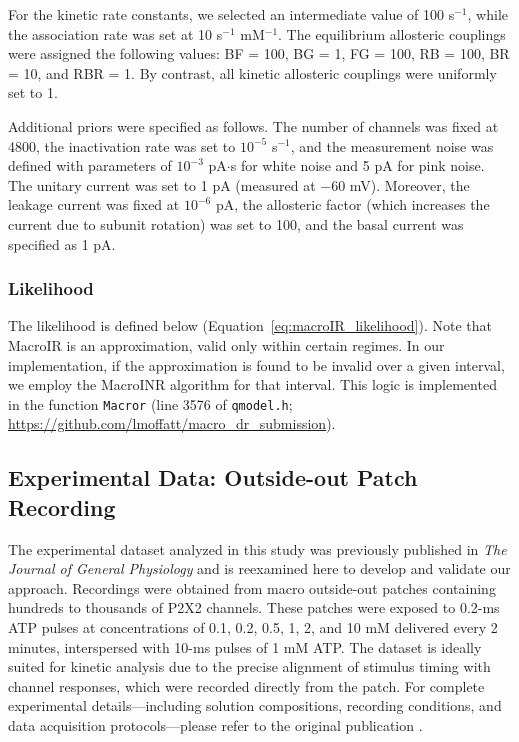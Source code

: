 \documentclass[pdflatex,sn-nature]{sn-jnl}%
\begin{document}
For the kinetic rate constants, we selected an intermediate value of 100 s$^{-1}$, while the association rate was set at 10 s$^{-1}$ mM$^{-1}$. The equilibrium allosteric couplings were assigned the following values: BF = 100, BG = 1, FG = 100, RB = 100, BR = 10, and RBR = 1. By contrast, all kinetic allosteric couplings were uniformly set to 1.

Additional priors were specified as follows. The number of channels was fixed at 4800, the inactivation rate was set to $10^{-5}$ s$^{-1}$, and the measurement noise was defined with parameters of $10^{-3}$ pA$\cdot$s for white noise and 5 pA for pink noise. The unitary current was set to 1 pA (measured at $-60$ mV). Moreover, the leakage current was fixed at $10^{-6}$ pA, the allosteric factor (which increases the current due to subunit rotation) was set to 100, and the basal current was specified as 1 pA.   

\subsubsection*{Likelihood}
The likelihood is defined below (Equation~\eqref{eq:macroIR_likelihood}). Note that MacroIR is an approximation, valid only within certain regimes. In our implementation, if the approximation is found to be invalid over a given interval, we employ the MacroINR algorithm for that interval. This logic is implemented in the function \texttt{Macror} (line 3576 of \texttt{qmodel.h}; \url{https://github.com/lmoffatt/macro_dr_submission}).


\subsection{Experimental Data: Outside-out Patch Recording}

The experimental dataset analyzed in this study was previously published in \textit{The Journal of General Physiology} \cite{Moffatt_hume} and is reexamined here to develop and validate our approach. Recordings were obtained from macro outside-out patches containing hundreds to thousands of P2X2 channels. These patches were exposed to 0.2-ms ATP pulses at concentrations of 0.1, 0.2, 0.5, 1, 2, and 10 mM delivered every 2 minutes, interspersed with 10-ms pulses of 1 mM ATP. The dataset is ideally suited for kinetic analysis due to the precise alignment of stimulus timing with channel responses, which were recorded directly from the patch. For complete experimental details—including solution compositions, recording conditions, and data acquisition protocols—please refer to the original publication \cite{Moffatt_hume}.
\end{document}
